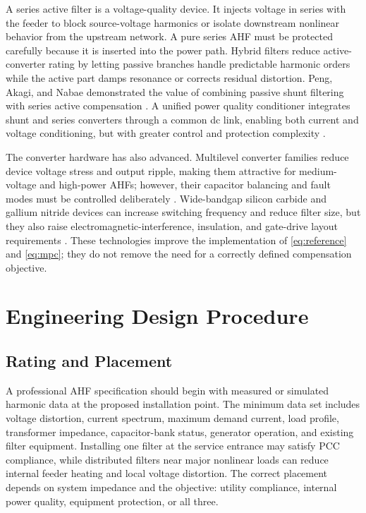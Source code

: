 \documentclass[conference]{IEEEtran}
\begin{document}
A series active filter is a voltage-quality device. It injects voltage in series with the feeder to block source-voltage harmonics or isolate downstream nonlinear behavior from the upstream network. A pure series AHF must be protected carefully because it is inserted into the power path. Hybrid filters reduce active-converter rating by letting passive branches handle predictable harmonic orders while the active part damps resonance or corrects residual distortion. Peng, Akagi, and Nabae demonstrated the value of combining passive shunt filtering with series active compensation \cite{Peng1990}. A unified power quality conditioner integrates shunt and series converters through a common dc link, enabling both current and voltage conditioning, but with greater control and protection complexity \cite{Fujita1998}.

The converter hardware has also advanced. Multilevel converter families reduce device voltage stress and output ripple, making them attractive for medium-voltage and high-power AHFs; however, their capacitor balancing and fault modes must be controlled deliberately \cite{Franquelo2008}. Wide-bandgap silicon carbide and gallium nitride devices can increase switching frequency and reduce filter size, but they also raise electromagnetic-interference, insulation, and gate-drive layout requirements \cite{Millan2014}. These technologies improve the implementation of \eqref{eq:reference} and \eqref{eq:mpc}; they do not remove the need for a correctly defined compensation objective.

\section{Engineering Design Procedure}
\subsection{Rating and Placement}
A professional AHF specification should begin with measured or simulated harmonic data at the proposed installation point. The minimum data set includes voltage distortion, current spectrum, maximum demand current, load profile, transformer impedance, capacitor-bank status, generator operation, and existing filter equipment. Installing one filter at the service entrance may satisfy PCC compliance, while distributed filters near major nonlinear loads can reduce internal feeder heating and local voltage distortion. The correct placement depends on system impedance and the objective: utility compliance, internal power quality, equipment protection, or all three.
\end{document}
